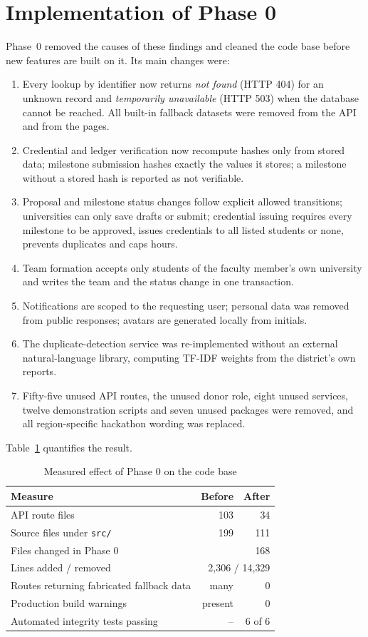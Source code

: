 \section{Implementation of Phase 0}
Phase~0 removed the causes of these findings and cleaned the code base before new features are built on it. Its main changes were:
\begin{enumerate}
  \item Every lookup by identifier now returns \emph{not found} (HTTP 404) for an unknown record and \emph{temporarily unavailable} (HTTP 503) when the database cannot be reached. All built-in fallback datasets were removed from the API and from the pages.
  \item Credential and ledger verification now recompute hashes only from stored data; milestone submission hashes exactly the values it stores; a milestone without a stored hash is reported as not verifiable.
  \item Proposal and milestone status changes follow explicit allowed transitions; universities can only save drafts or submit; credential issuing requires every milestone to be approved, issues credentials to all listed students or none, prevents duplicates and caps hours.
  \item Team formation accepts only students of the faculty member's own university and writes the team and the status change in one transaction.
  \item Notifications are scoped to the requesting user; personal data was removed from public responses; avatars are generated locally from initials.
  \item The duplicate-detection service was re-implemented without an external natural-language library, computing TF-IDF weights from the district's own reports.
  \item Fifty-five unused API routes, the unused donor role, eight unused services, twelve demonstration scripts and seven unused packages were removed, and all region-specific hackathon wording was replaced.
\end{enumerate}

Table~\ref{tab:phase0} quantifies the result.

\begin{table}[H]
\centering
\caption{Measured effect of Phase 0 on the code base}
\label{tab:phase0}
\small
\begin{tabular}{@{}lrr@{}}
\toprule
\textbf{Measure} & \textbf{Before} & \textbf{After} \\
\midrule
API route files & 103 & 34 \\
Source files under \texttt{src/} & 199 & 111 \\
Files changed in Phase 0 & \multicolumn{2}{r}{168} \\
Lines added / removed & \multicolumn{2}{r}{2{,}306 / 14{,}329} \\
Routes returning fabricated fallback data & many & 0 \\
Production build warnings & present & 0 \\
Automated integrity tests passing & -- & 6 of 6 \\
\bottomrule
\end{tabular}
\end{table}

